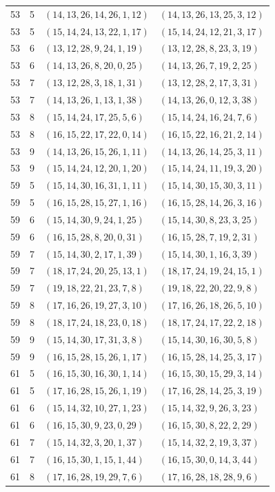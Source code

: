 \begin{longtable}{rrll}
53&5&$(14,13,26,14,26,1,12)$&$(14,13,26,13,25,3,12)$\\
53&5&$(15,14,24,13,22,1,17)$&$(15,14,24,12,21,3,17)$\\
53&6&$(13,12,28,9,24,1,19)$&$(13,12,28,8,23,3,19)$\\
53&6&$(14,13,26,8,20,0,25)$&$(14,13,26,7,19,2,25)$\\
53&7&$(13,12,28,3,18,1,31)$&$(13,12,28,2,17,3,31)$\\
53&7&$(14,13,26,1,13,1,38)$&$(14,13,26,0,12,3,38)$\\
53&8&$(15,14,24,17,25,5,6)$&$(15,14,24,16,24,7,6)$\\
53&8&$(16,15,22,17,22,0,14)$&$(16,15,22,16,21,2,14)$\\
53&9&$(14,13,26,15,26,1,11)$&$(14,13,26,14,25,3,11)$\\
53&9&$(15,14,24,12,20,1,20)$&$(15,14,24,11,19,3,20)$\\
59&5&$(15,14,30,16,31,1,11)$&$(15,14,30,15,30,3,11)$\\
59&5&$(16,15,28,15,27,1,16)$&$(16,15,28,14,26,3,16)$\\
59&6&$(15,14,30,9,24,1,25)$&$(15,14,30,8,23,3,25)$\\
59&6&$(16,15,28,8,20,0,31)$&$(16,15,28,7,19,2,31)$\\
59&7&$(15,14,30,2,17,1,39)$&$(15,14,30,1,16,3,39)$\\
59&7&$(18,17,24,20,25,13,1)$&$(18,17,24,19,24,15,1)$\\
59&7&$(19,18,22,21,23,7,8)$&$(19,18,22,20,22,9,8)$\\
59&8&$(17,16,26,19,27,3,10)$&$(17,16,26,18,26,5,10)$\\
59&8&$(18,17,24,18,23,0,18)$&$(18,17,24,17,22,2,18)$\\
59&9&$(15,14,30,17,31,3,8)$&$(15,14,30,16,30,5,8)$\\
59&9&$(16,15,28,15,26,1,17)$&$(16,15,28,14,25,3,17)$\\
61&5&$(16,15,30,16,30,1,14)$&$(16,15,30,15,29,3,14)$\\
61&5&$(17,16,28,15,26,1,19)$&$(17,16,28,14,25,3,19)$\\
61&6&$(15,14,32,10,27,1,23)$&$(15,14,32,9,26,3,23)$\\
61&6&$(16,15,30,9,23,0,29)$&$(16,15,30,8,22,2,29)$\\
61&7&$(15,14,32,3,20,1,37)$&$(15,14,32,2,19,3,37)$\\
61&7&$(16,15,30,1,15,1,44)$&$(16,15,30,0,14,3,44)$\\
61&8&$(17,16,28,19,29,7,6)$&$(17,16,28,18,28,9,6)$\\

\end{longtable}
